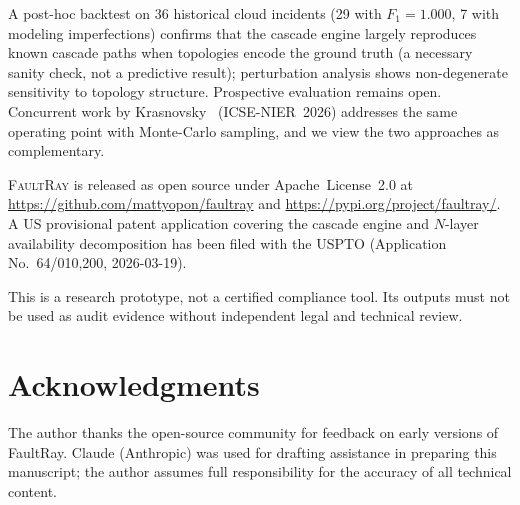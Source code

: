 \documentclass[10pt,twocolumn]{article}
\begin{document}
A post-hoc backtest on 36 historical cloud incidents (29 with
$F_1 = 1.000$, 7 with modeling imperfections) confirms that the
cascade engine largely reproduces known cascade paths when
topologies encode the ground truth (a necessary sanity check,
not a predictive result); perturbation analysis shows
non-degenerate sensitivity to topology structure. Prospective
evaluation remains open. Concurrent work by Krasnovsky~\cite{krasnovsky2026}
(ICSE-NIER~2026) addresses the same operating point with Monte-Carlo
sampling, and we view the two approaches as complementary.

\textsc{FaultRay} is released as open source under Apache~License~2.0
at \url{https://github.com/mattyopon/faultray} and
\url{https://pypi.org/project/faultray/}.
A US provisional patent application covering the cascade engine and
$N$-layer availability decomposition has been filed with the USPTO
(Application No.~64/010,200, 2026-03-19).

This is a research prototype, not a certified compliance tool. Its
outputs must not be used as audit evidence without independent legal
and technical review.

\section*{Acknowledgments}
The author thanks the open-source community for feedback on early versions of FaultRay.
Claude (Anthropic) was used for drafting assistance in preparing this manuscript;
the author assumes full responsibility for the accuracy of all technical content.
\end{document}
